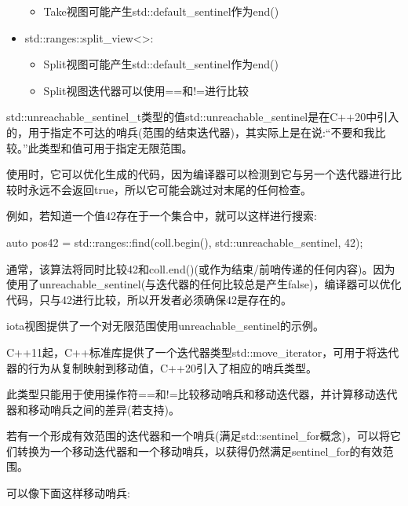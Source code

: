 \begin{itemize}
\begin{itemize}
\item
Take视图可能产生std::default\_sentinel作为end()
\end{itemize}

\item
std::ranges::split\_view<>:

\begin{itemize}
\item
Split视图可能产生std::default\_sentinel作为end()

\item
Split视图迭代器可以使用==和!=进行比较
\end{itemize}
\end{itemize}


std::unreachable\_sentinel\_t类型的值std::unreachable\_sentinel是在C++20中引入的，用于指定不可达的哨兵(范围的结束迭代器)，其实际上是在说:“不要和我比较。”此类型和值可用于指定无限范围。

使用时，它可以优化生成的代码，因为编译器可以检测到它与另一个迭代器进行比较时永远不会返回true，所以它可能会跳过对末尾的任何检查。

例如，若知道一个值42存在于一个集合中，就可以这样进行搜索:

\begin{cpp}
auto pos42 = std::ranges::find(coll.begin(), std::unreachable_sentinel,
					42);
\end{cpp}

通常，该算法将同时比较42和coll.end()(或作为结束/前哨传递的任何内容)。因为使用了unreachable\_sentinel(与迭代器的任何比较总是产生false)，编译器可以优化代码，只与42进行比较，所以开发者必须确保42是存在的。

iota视图提供了一个对无限范围使用unreachable\_sentinel的示例。


C++11起，C++标准库提供了一个迭代器类型std::move\_iterator，可用于将迭代器的行为从复制映射到移动值，C++20引入了相应的哨兵类型。

此类型只能用于使用操作符==和!=比较移动哨兵和移动迭代器，并计算移动迭代器和移动哨兵之间的差异(若支持)。

若有一个形成有效范围的迭代器和一个哨兵(满足std::sentinel\_for概念)，可以将它们转换为一个移动迭代器和一个移动哨兵，以获得仍然满足sentinel\_for的有效范围。

可以像下面这样移动哨兵:

